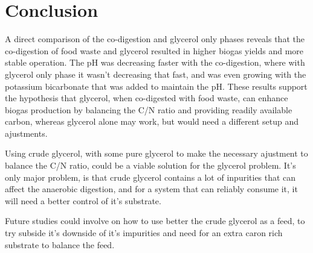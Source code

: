 \chapter{Conclusion}
\label{ch:conclusion}

A direct comparison of the co-digestion and glycerol only phases reveals that the co-digestion of food waste and glycerol resulted in higher biogas yields and more stable operation. The pH was decreasing faster with the co-digestion, where with glycerol only phase it wasn't decreasing that fast, and was even growing with the potassium bicarbonate that was added to maintain the pH. These results support the hypothesis that glycerol, when co-digested with food waste, can enhance biogas production by balancing the C/N ratio and providing readily available carbon, whereas glycerol alone may work, but would need a different setup and ajustments.

Using crude glycerol, with some pure glycerol to make the necessary ajustment to balance the C/N ratio, could be a viable solution for the glycerol problem. It's only major problem, is that crude glycerol contains a lot of inpurities that can affect the anaerobic digestion, and for a system that can reliably consume it, it will need a better control of it's substrate.

Future studies could involve on how to use better the crude glycerol as a feed, to try subside it's downside of it's impurities and need for an extra caron rich substrate to balance the feed.
